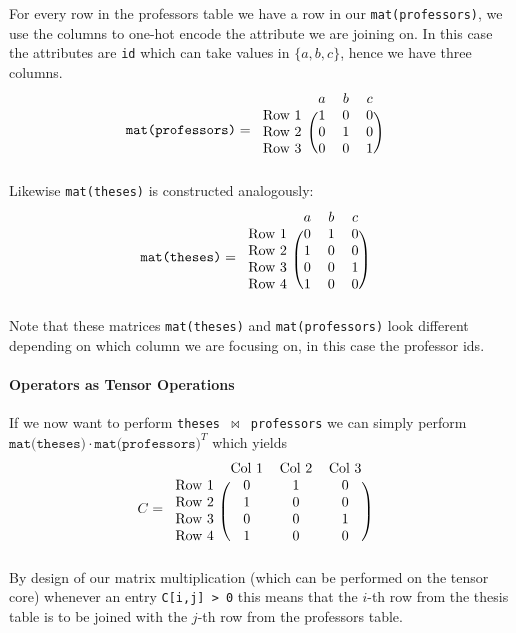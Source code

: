 \documentclass{paper}
\begin{document}
	For every row in the professors table we have a row in our \texttt{mat(professors)}, we use the columns to one-hot encode the attribute we are joining on. In this case the attributes are \texttt{id} which can take values in $\{a,b,c\}$, hence we have three columns.
	\begin{align*}\texttt{mat(professors)} &= 
	\begin{blockarray}{cccc}
	& a & b & c \\
	\begin{block}{c(ccc)}
		\text{Row 1} & 1 & 0 & 0 \\
		\text{Row 2} & 0 & 1 & 0 \\
		\text{Row 3} & 0 & 0 & 1 \\
	\end{block}
\end{blockarray}
	\end{align*}
Likewise \texttt{mat(theses)} is constructed analogously:
\begin{align*}\texttt{mat(theses)} &= 
		\begin{blockarray}{cccc}
			& a & b & c \\
			\begin{block}{c(ccc)}
				\text{Row 1} & 0 & 1 & 0 \\
				\text{Row 2} & 1 & 0 & 0 \\
				\text{Row 3} & 0 & 0 & 1 \\
				\text{Row 4} & 1 & 0 & 0 \\
			\end{block}
		\end{blockarray}
\end{align*}
Note that these matrices \texttt{mat(theses)} and \texttt{mat(professors)} look different depending on which column we are focusing on, in this case the professor ids.
	
	\paragraph{Operators as Tensor Operations}
	
	If we now want to perform \texttt{theses $\Join$ professors} we can simply perform $\texttt{mat(theses)} \cdot \texttt{mat(professors)}^T$ which yields 
\begin{align*} C&=
	\begin{blockarray}{cccc} 
		& \text{Col 1} & \text{Col 2} & \text{Col 3} \\
		\begin{block}{c(ccc)}
			\text{Row 1} & 0 & 1 & 0 \\
			\text{Row 2} & 1 & 0 & 0 \\
			\text{Row 3} & 0 & 0 & 1 \\
			\text{Row 4} & 1 & 0 & 0 \\
		\end{block}
	\end{blockarray}
\end{align*}	
By design of our matrix multiplication (which can be performed on the tensor core) whenever an entry \texttt{C[i,j] > 0} this means that the $i$-th row from the thesis table is to be joined with the $j$-th row from the professors table.
\end{document}
